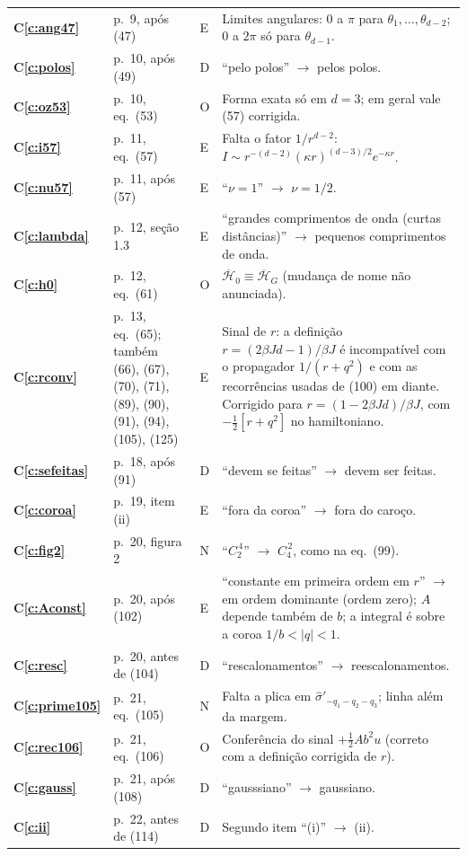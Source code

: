 \documentclass[12pt,a4paper]{article}
\newcommand{\Hb}{\overline{\mathcal{H}}}
\newcommand{\sh}{\widehat{\sigma}}
\newcounter{corr}
\newcommand{\Cref}[1]{\textbf{C\ref{#1}}}
\begin{document}
{\begin{longtable}{@{}p{0.9cm}p{2.9cm}p{0.6cm}p{10.6cm}@{}}
\Cref{c:ang47} & p.~9, após (47) & E & Limites angulares: $0$ a $\pi$ para $\theta_1,\dots,\theta_{d-2}$; $0$ a $2\pi$ só para $\theta_{d-1}$.\\
\Cref{c:polos} & p.~10, após (49) & D & ``pelo polos'' $\to$ pelos polos.\\
\Cref{c:oz53} & p.~10, eq.~(53) & O & Forma exata só em $d=3$; em geral vale (57) corrigida.\\
\Cref{c:i57} & p.~11, eq.~(57) & E & Falta o fator $1/r^{d-2}$: $I\sim r^{-(d-2)}(\kappa r)^{(d-3)/2}e^{-\kappa r}$.\\
\Cref{c:nu57} & p.~11, após (57) & E & ``$\nu=1$'' $\to$ $\nu=1/2$.\\
\Cref{c:lambda} & p.~12, seção 1.3 & E & ``grandes comprimentos de onda (curtas distâncias)'' $\to$ pequenos comprimentos de onda.\\
\Cref{c:h0} & p.~12, eq.~(61) & O & $\Hb_0\equiv\Hb_G$ (mudança de nome não anunciada).\\
\Cref{c:rconv} & p.~13, eq.~(65); também (66), (67), (70), (71), (89), (90), (91), (94), (105), (125) & E &
Sinal de $r$: a definição $r=(2\beta Jd-1)/\beta J$ é incompatível com o propagador $1/(r+q^2)$ e com as
recorrências usadas de (100) em diante. Corrigido para $r=(1-2\beta Jd)/\beta J$, com $-\frac12[r+q^2]$
no hamiltoniano.\\
\Cref{c:sefeitas} & p.~18, após (91) & D & ``devem se feitas'' $\to$ devem ser feitas.\\
\Cref{c:coroa} & p.~19, item (ii) & E & ``fora da coroa'' $\to$ fora do caroço.\\
\Cref{c:fig2} & p.~20, figura 2 & N & ``$C_2^{\,4}$'' $\to$ $C_4^{\,2}$, como na eq.~(99).\\
\Cref{c:Aconst} & p.~20, após (102) & E & ``constante em primeira ordem em $r$'' $\to$ em ordem dominante (ordem zero); $A$ depende também de $b$; a integral é sobre a coroa $1/b<|q|<1$.\\
\Cref{c:resc} & p.~20, antes de (104) & D & ``rescalonamentos'' $\to$ reescalonamentos.\\
\Cref{c:prime105} & p.~21, eq.~(105) & N & Falta a plica em $\sh'_{-q_1-q_2-q_3}$; linha além da margem.\\
\Cref{c:rec106} & p.~21, eq.~(106) & O & Conferência do sinal $+\frac12Ab^2u$ (correto com a definição corrigida de $r$).\\
\Cref{c:gauss} & p.~21, após (108) & D & ``gausssiano'' $\to$ gaussiano.\\
\Cref{c:ii} & p.~22, antes de (114) & D & Segundo item ``(i)'' $\to$ (ii).\\

\end{longtable}}
\end{document}
